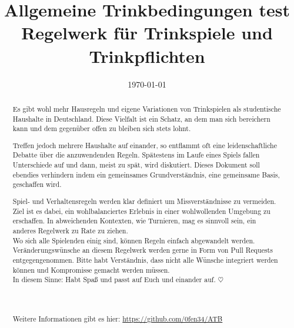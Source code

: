 \documentclass{report}
\title{\Huge Allgemeine Trinkbedingungen test \\[2ex] \Large Regelwerk für Trinkspiele und Trinkpflichten}
\author{}
\date{\today}
\begin{document}


\maketitle
\begin{abstract}

	Es gibt wohl mehr Hausregeln und eigene Variationen von Trinkspielen als studentische Haushalte in Deutschland.
	Diese Vielfalt ist ein Schatz, an dem man sich bereichern kann und dem gegenüber offen zu bleiben sich stets lohnt.
	
	Treffen jedoch mehrere Haushalte auf einander, so entflammt oft eine leidenschaftliche Debatte über die anzuwendenden Regeln.
	Spätestens im Laufe eines Spiels fallen Unterschiede auf und dann, meist zu spät, wird diskutiert.
	Dieses Dokument soll ebendies verhindern indem ein gemeinsames Grundverständnis, eine gemeinsame Basis, geschaffen wird.

	Spiel- und Verhaltensregeln werden klar definiert um Missverständnisse zu vermeiden.
	Ziel ist es dabei, ein wohlbalanciertes Erlebnis in einer wohlwollenden Umgebung zu erschaffen.
	In abweichenden Kontexten, wie Turnieren, mag es sinnvoll sein, ein anderes Regelwerk zu Rate zu ziehen.
	\\

	Wo sich alle Spielenden einig sind, können Regeln einfach abgewandelt werden.
	Veränderungswünsche an diesem Regelwerk werden gerne in Form von Pull Requests entgegengenommen.
	Bitte habt Verständnis, dass nicht alle Wünsche integriert werden können und Kompromisse gemacht werden müssen.
	\\

	In diesem Sinne: Habt Spaß und passt auf Euch und einander auf.
	\begin{math}
		\heartsuit
	\end{math}
	\\
	\\
	\\
	\\
	Weitere Informationen gibt es hier:
	\url{https://github.com/0fen34/ATB}
\end{abstract}
\tableofcontents
\cleardoublepage{}











\end{document}

